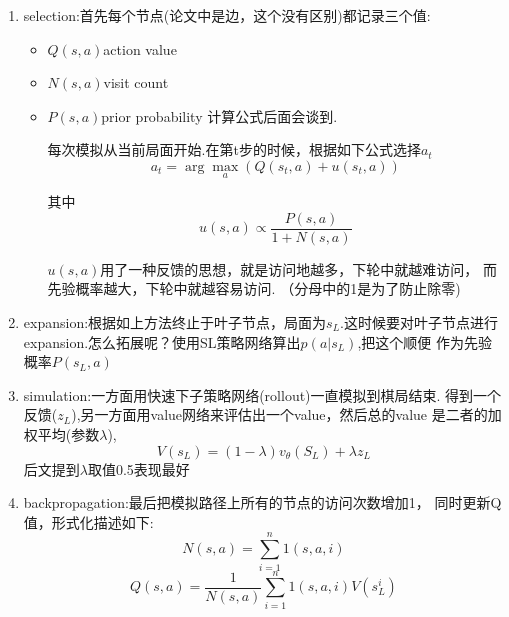\documentclass{article}
\begin{document}
            \begin{enumerate}
                \item selection:首先每个节点(论文中是边，这个没有区别)都记录三个值:
                \begin{itemize}
                    \item $Q(s,a)$action value
                    \item $N(s,a)$visit count
                    \item $P(s,a)$prior probability
                    计算公式后面会谈到.

                    每次模拟从当前局面开始.在第t步的时候，根据如下公式选择$a_t$
                    \begin{equation}
                        a_t = \arg\max_a(Q(s_t,a)+u(s_t,a))
                    \end{equation}

                    其中
                    \begin{equation}
                        u(s,a) \propto \frac{P(s,a)}{1+N(s,a)}
                    \end{equation}

                    $u(s,a)$用了一种反馈的思想，就是访问地越多，下轮中就越难访问，
                    而先验概率越大，下轮中就越容易访问.
                    （分母中的1是为了防止除零)
                \end{itemize}
                \item expansion:根据如上方法终止于叶子节点，局面为$s_L$.这时候要对叶子节点进行
                expansion.怎么拓展呢？使用SL策略网络算出$p(a|s_L)$,把这个顺便
                作为先验概率$P(s_L,a)$
                \item simulation:一方面用快速下子策略网络(rollout)一直模拟到棋局结束.
                得到一个反馈($z_L$),另一方面用value网络来评估出一个value，然后总的value
                是二者的加权平均(参数$\lambda$),
                \begin{equation}
                    V(s_L) = (1-\lambda)v_\theta(S_L) + \lambda z_L
                \end{equation}
                后文提到$\lambda$取值0.5表现最好
                \item backpropagation:最后把模拟路径上所有的节点的访问次数增加1，
                同时更新Q值，形式化描述如下:
                \begin{equation}
                    N(s,a) = \sum_{i=1}^{n}1(s,a,i) 
                \end{equation}
                \begin{equation}
                    Q(s,a) = \frac{1}{N(s,a)} \sum_{i=1}^{n}1(s,a,i)V(s_{L}^i)
                \end{equation}
                

\end{enumerate}
\end{document}
